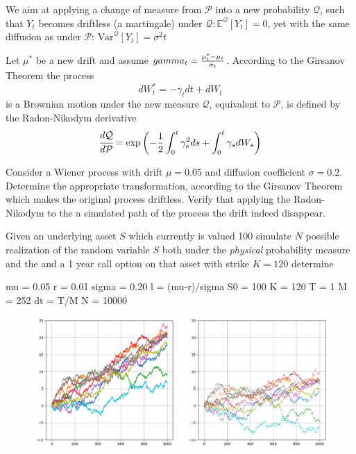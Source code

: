 \documentclass[12pt,a4paper]{book}
\begin{document}
\begin{exercise}[subtitle=Drifty Brownian Motion]
We aim at applying a change of measure from $\mathcal{P}$ into a new probability $\mathcal{Q}$, such that $Y_t$ becomes driftless (a martingale) under $\mathcal{Q}: \mathbb{E}^{\mathcal{Q}}[Y_t]=0$, yet with the same diffusion as under $\mathcal{P}$: $\text{Var}^{\mathcal{Q}}[Y_t]=\sigma^2 t$

Let $\mu^{*}$ be a new drift and assume $\\gamma_t = \frac{\mu_t^{*}-\mu_t}{\sigma_t}$. According to the Girsanov Theorem the process
\begin{equation}
dW^{*}_t = -\gamma_t dt + dW_t
\end{equation}
is a Brownian motion under the new measure $\mathcal{Q}$, equivalent to $\mathcal{P}$, is defined by the Radon-Nikodym derivative
\begin{equation}
\cfrac{d\mathcal{Q}}{d\mathcal{P}} = \exp\left(-\frac{1}{2}\int_0^t\gamma_s^2 ds + \int_0^t\gamma_s dW_s\right)
\end{equation}
\end{exercise}

\begin{exercise}
Consider a Wiener process with drift $\mu=0.05$ and diffusion coefficient $\sigma=0.2$. Determine the appropriate transformation, according to the Girsanov Theorem which makes the original process driftless. Verify that applying the Radon-Nikodym to the a simulated path of the process the drift indeed disappear.

\end{exercise}

\begin{exercise}
Given an underlying asset $S$ which currently is valued 100 simulate $N$ possible realization of the random variable $S$ both under the \emph{physical} probability measure and the 
and a 1 year call option on that asset with strike $K=120$ determine 


mu = 0.05
r = 0.01
sigma = 0.20
l = (mu-r)/sigma
S0 = 100
K = 120
T = 1
M = 252
dt = T/M
N = 10000
\begin{figure}[htbp]
	\begin{center}
		\includegraphics[width=0.5\linewidth]{addons/brownian_motion_girsanov}
	\end{center}
	\label{fig:brownian_motion_girsanov}
\end{figure}
\end{exercise}
\clearpage
\end{document}
